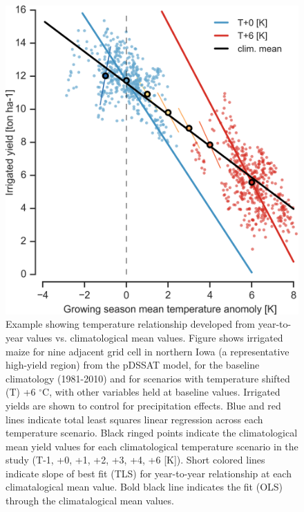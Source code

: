 \documentclass[preprint, 5p, times, twocolumn]{elsarticle}
\begin{document}
\begin{figure}[!h]
\centering
   \includegraphics[width=0.9\linewidth]{figures/tempyearvclim.png}
   \caption{Example showing temperature relationship developed from year-to-year values vs. climatological mean values. Figure shows irrigated maize for nine adjacent grid cell in northern Iowa (a representative high-yield region) from the pDSSAT model, for the baseline climatology (1981-2010) and for scenarios with temperature shifted (T) +6 $^{\circ}$C, with other variables held at baseline values. Irrigated yields are shown to control for precipitation effects. Blue and red lines indicate total least squares linear regression across each temperature scenario. Black ringed points indicate the climatological mean yield values for each climatological temperature scenario in the study (T-1, +0, +1, +2, +3, +4, +6 [K]). Short colored lines indicate slope of best fit (TLS) for year-to-year relationship at each climatalogical mean value. Bold black line indicates the fit (OLS) through the climatalogical mean values.}
   \label{fig:yearvclim}
\end{figure}
\end{document}
